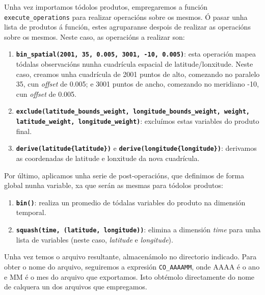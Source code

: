 Unha vez importamos tódolos produtos, empregaremos a función \texttt{execute\_\break operations} para realizar operacións sobre os mesmos. Ó pasar unha lista de produtos á función, estes agruparanse
despois de realizar as operacións sobre os mesmos. Neste caso, as operacións a realizar son:
\begin{enumerate}
    \item \texttt{\textbf{bin\_spatial(2001, 35, 0.005, 3001, -10, 0.005)}}: esta operación mapea tódalas observacións nunha cuadrícula espacial de latitude/lonxitude. Neste caso, creamos unha
    cuadrícula de 2001 puntos de alto, comezando no paralelo 35\textdegree, cun \textit{offset} de 0.005\textdegree; e 3001 puntos de ancho, comezando no meridiano -10\textdegree, cun \textit{offset}
    de 0.005.
    \item \texttt{\textbf{exclude(latitude\_bounds\_weight, longitude\_bounds\_weight, weight, latitude\_weight, longitude\_weight)}}: excluímos estas variables do produto final.
    \item \texttt{\textbf{derive(latitude\{latitude\})}} e  \texttt{\textbf{derive(longitude\{longitude\})}}: derivamos as coordenadas de latitude e lonxitude da nova cuadrícula.
\end{enumerate}

Por último, aplicamos unha serie de post-operacións, que definimos de forma global nunha variable, xa que serán as mesmas para tódolos produtos:
\begin{enumerate}
    \item \texttt{\textbf{bin()}}: realiza un promedio de tódalas variables do produto na dimensión temporal.
    \item \texttt{\textbf{squash(time, (latitude, longitude))}}: elimina a dimensión \textit{time} para unha lista de variables (neste caso, \textit{latitude} e \textit{longitude}).
\end{enumerate}

Unha vez temos o arquivo resultante, almacenámolo no directorio indicado. Para obter o nome do arquivo, seguiremos a expresión \texttt{CO\_AAAAMM}, onde AAAA é o ano e MM é o mes do arquivo que
exportamos. Isto obtémolo directamente do nome de calquera un dos arquivos que empregamos.

